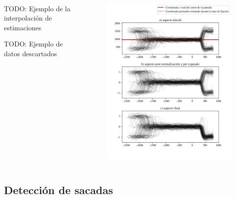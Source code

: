 \documentclass[aspectratio=169]{beamer}
\begin{document}
\begin{frame}{~}

  \begin{columns}
    \begin{column}{0.5\textwidth}
      TODO: Ejemplo de la interpolación de estimaciones \par
      TODO: Ejemplo de datos descartados
    \end{column}
    \begin{column}{0.5\textwidth}
      \begin{figure}
        \centering
        \includegraphics[width=\linewidth]{img/normalization-looks-example.png}
      \end{figure}
    \end{column}
  \end{columns}

\end{frame}

\subsection{Detección de sacadas}
\end{document}
